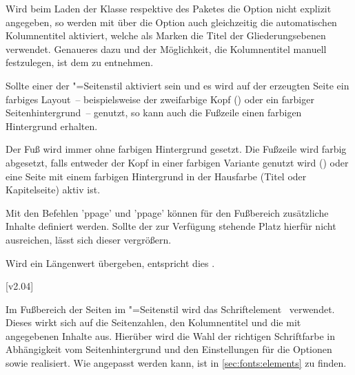 \begin{DeclareEntity*}{}
\begin{DeclareEntity*}{}
\begin{DeclareEntity*}{}
\begin{Declaration}
%
Wird beim Laden der Klasse respektive des Paketes  
die Option  
nicht explizit angegeben, so werden mit  über die 
Option  auch 
gleichzeitig die automatischen Kolumnentitel aktiviert, welche als Marken die 
Titel der Gliederungsebenen verwendet. Genaueres dazu und der Möglichkeit, die 
Kolumnentitel manuell festzulegen, ist dem \scrguide zu entnehmen.

%
Sollte einer der "=Seitenstil aktiviert sein und es wird 
auf der erzeugten Seite ein farbiges Layout~--  beispielsweise der zweifarbige 
Kopf () oder ein farbiger Seitenhintergrund~-- genutzt, 
so kann auch die Fußzeile einen farbigen Hintergrund erhalten.
\begin{DeclareValues}
  Der Fuß wird immer ohne farbigen Hintergrund gesetzt.
  Die Fußzeile wird farbig abgesetzt, falls entweder der Kopf in einer farbigen
  Variante genutzt wird () oder eine Seite mit einem 
  farbigen Hintergrund in der Hausfarbe (Titel oder Kapitelseite) aktiv ist.
\end{DeclareValues}

Mit den Befehlen 'ppage' und 'ppage' können 
für den Fußbereich zusätzliche Inhalte definiert werden. Sollte der zur 
Verfügung stehende Platz hierfür nicht ausreichen, lässt sich dieser vergrößern.
\begin{DeclareValues}
\itemval{\PLength}
  Wird ein Längenwert übergeben, entspricht dies 
  .
\end{DeclareValues}
\end{Declaration}

\begin{Declaration}
  {}
  [v2.04]

Im Fußbereich der Seiten im "=Seitenstil wird das 
Schriftelement~ verwendet. Dieses wirkt sich auf die 
Seitenzahlen, den Kolumnentitel und die mit  angegebenen 
Inhalte aus. Hierüber wird die Wahl der richtigen Schriftfarbe in Abhängigkeit 
vom Seitenhintergrund und den Einstellungen für die Optionen  
sowie  realisiert. Wie  angepasst werden 
kann, ist in \autoref{sec:fonts:elements} zu finden.
\end{Declaration}


\end{DeclareEntity*}
\end{DeclareEntity*}
\end{DeclareEntity*}
